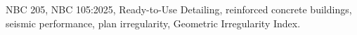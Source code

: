 NBC 205, NBC 105:2025, Ready-to-Use Detailing, reinforced concrete buildings, seismic performance, plan irregularity, Geometric Irregularity Index.
